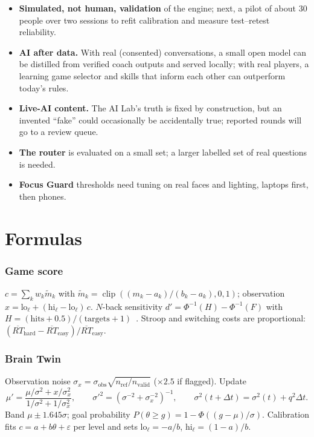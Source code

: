 \documentclass[11pt,a4paper]{article}
\begin{document}
\begin{itemize}
\item \textbf{Simulated, not human, validation} of the engine; next, a pilot of about 30 people over two sessions to refit calibration and measure test--retest reliability.
\item \textbf{AI after data.} With real (consented) conversations, a small open model can be distilled from verified coach outputs and served locally; with real players, a learning game selector and skills that inform each other can outperform today's rules.
\item \textbf{Live-AI content.} The AI Lab's truth is fixed by construction, but an invented ``fake'' could occasionally be accidentally true; reported rounds will go to a review queue.
\item \textbf{The router} is evaluated on a small set; a larger labelled set of real questions is needed.
\ifcamera\item \textbf{Focus Guard} thresholds need tuning on real faces and lighting, laptops first, then phones.\fi
\end{itemize}

\appendix
\section{Formulas}
\label{app:formulas}

\subsubsection{Game score} $c=\sum_k w_k\tilde m_k$ with $\tilde m_k=\operatorname{clip}((m_k-a_k)/(b_k-a_k),0,1)$; observation $x=\text{lo}_\ell+(\text{hi}_\ell-\text{lo}_\ell)\,c$. $N$-back sensitivity $d'=\Phi^{-1}(H)-\Phi^{-1}(F)$ with $H=(\text{hits}+0.5)/(\text{targets}+1)$~\cite{hautus}. Stroop and switching costs are proportional: $(\overline{RT}_{\text{hard}}-\overline{RT}_{\text{easy}})/\overline{RT}_{\text{easy}}$.

\subsubsection{Brain Twin} Observation noise $\sigma_x=\sigma_{\text{obs}}\sqrt{n_{\text{ref}}/n_{\text{valid}}}$ ($\times2.5$ if flagged). Update
\begin{equation}
\mu'=\frac{\mu/\sigma^2+x/\sigma_x^2}{1/\sigma^2+1/\sigma_x^2},\qquad \sigma'^2=\left(\sigma^{-2}+\sigma_x^{-2}\right)^{-1},\qquad \sigma^2(t+\Delta t)=\sigma^2(t)+q^2\Delta t .
\end{equation}
Band $\mu\pm1.645\sigma$; goal probability $P(\theta\ge g)=1-\Phi((g-\mu)/\sigma)$. Calibration fits $c=a+b\theta+\varepsilon$ per level and sets $\text{lo}_\ell=-a/b$, $\text{hi}_\ell=(1-a)/b$.
\end{document}
